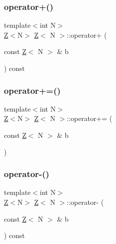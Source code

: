 \mbox{\label{classZ_a1a01f7aaa064fe201c2e0cc72da02960}} 
\subsubsection{\texorpdfstring{operator+()}{operator+()}}
{\footnotesize\ttfamily template$<$int N$>$ \\
\hyperlink{classZ}{Z}$<$N$>$ \hyperlink{classZ}{Z}$<$ N $>$\+::operator+ (\begin{DoxyParamCaption}\item[{const \hyperlink{classZ}{Z}$<$ N $>$ \&}]{b }\end{DoxyParamCaption}) const\hspace{0.3cm}{\ttfamily [inline]}}

\mbox{\label{classZ_a3b61b86ccc14f54010c58e8ff2745d91}} 
\subsubsection{\texorpdfstring{operator+=()}{operator+=()}}
{\footnotesize\ttfamily template$<$int N$>$ \\
\hyperlink{classZ}{Z}$<$N$>$ \hyperlink{classZ}{Z}$<$ N $>$\+::operator+= (\begin{DoxyParamCaption}\item[{const \hyperlink{classZ}{Z}$<$ N $>$ \&}]{b }\end{DoxyParamCaption})\hspace{0.3cm}{\ttfamily [inline]}}

\mbox{\label{classZ_ac4751d1ef56abaee7ed90f29939324f2}} 
\subsubsection{\texorpdfstring{operator-\/()}{operator-()}\hspace{0.1cm}{\footnotesize\ttfamily [1/2]}}
{\footnotesize\ttfamily template$<$int N$>$ \\
\hyperlink{classZ}{Z}$<$N$>$ \hyperlink{classZ}{Z}$<$ N $>$\+::operator-\/ (\begin{DoxyParamCaption}\item[{const \hyperlink{classZ}{Z}$<$ N $>$ \&}]{b }\end{DoxyParamCaption}) const\hspace{0.3cm}{\ttfamily [inline]}}

